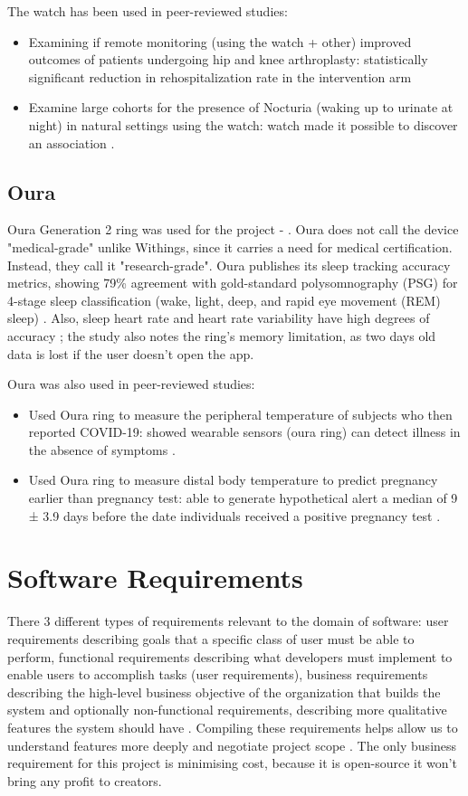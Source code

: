 The watch has been used in peer-reviewed studies:
\begin{itemize}
    \item Examining if remote monitoring (using the watch + other) improved outcomes of patients undergoing hip and knee arthroplasty: statistically significant reduction in rehospitalization rate in the intervention arm \cite{withingsHospitalization}
    \item Examine large cohorts for the presence of Nocturia (waking up to urinate at night) in natural settings using the watch: watch made it possible to discover an association \cite{withingsNocturia}.
\end{itemize}


\subsection{Oura}
\label{section:OuraRing}
Oura Generation 2 ring was used for the project - \cite{ouraStorePage}. Oura does not call the device "medical-grade" unlike Withings, since it carries a need for medical certification. Instead, they call it "research-grade". Oura publishes its sleep tracking accuracy metrics, showing 79\% agreement with gold-standard polysomnography (PSG) for 4-stage sleep classification (wake, light, deep, and rapid eye movement (REM) sleep) \cite{OuraSleepAcc}. Also, sleep heart rate and heart rate variability have high degrees of accuracy \cite{ouraHeartAcc}; the study also notes the ring's memory limitation, as two days old data is lost if the user doesn't open the app. 

Oura was also used in peer-reviewed studies:
\begin{itemize}
    \item Used Oura ring to measure the peripheral temperature of subjects who then reported COVID-19: showed wearable sensors (oura ring) can detect illness in the absence of symptoms \cite{smarr2020feasibility}.
    \item Used Oura ring to measure distal body temperature to predict pregnancy earlier than pregnancy test: able to generate hypothetical alert a median of 9 ± 3.9 days before the date individuals received a positive pregnancy test \cite{ouraPregnancy}.
\end{itemize}
\section{Software Requirements}
There 3 different types of requirements relevant to the domain of software: user requirements describing goals that a specific class of user must be able to perform, functional requirements describing what developers must implement to enable users to accomplish tasks (user requirements), business requirements describing the high-level business objective of the organization that builds the system and optionally non-functional requirements, describing more qualitative features the system should have \cite{wiegers2013software}. Compiling these requirements helps allow us to understand features more deeply and negotiate project scope \cite{Damian2006An}. The only business requirement for this project is minimising cost, because it is open-source it won't bring any profit to creators.

